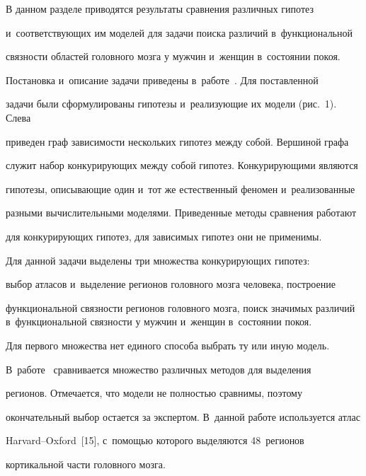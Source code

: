  

     В данном разделе приводятся результаты сравнения различных гипотез 

     и~соответствующих им моделей для задачи поиска различий в~функциональной 

связности областей головного мозга у мужчин и~женщин в~состоянии покоя. 

Постановка и~описание задачи приведены в~работе~\cite{3-tir}. Для поставленной 

задачи были сформулированы гипотезы и~реализующие их модели (рис.~1). Слева 

приведен граф зависимости нескольких гипотез между собой. Вершиной графа 

служит набор конкурирующих между собой гипотез. Конкурирующими являются 

гипотезы, описывающие один и~тот же естественный феномен и~реализованные 

разными вычислительными моделями. Приведенные методы сравнения работают 

для конкурирующих гипотез, для зависимых гипотез они не при\-ме\-нимы.

{



}

     

     Для данной задачи выделены три множества конкурирующих гипотез: 

выбор атласов и~выделение регионов головного мозга человека, построение 

функциональной связности регионов головного мозга, поиск значимых различий в~функциональной связности у мужчин и~женщин в~состоянии покоя. 

     

     Для первого множества нет единого способа выбрать ту или иную модель. 

В~работе~\cite{14-tir} сравнивается множество различных методов для выделения 

регионов. Отмечается, что модели не полностью сравнимы, поэтому 

окончательный выбор остается за экспертом. В~данной работе используется атлас 

Harvard--Oxford~[15], с~помощью которого выделяются 48~регионов 

кортикальной части головного мозга.



